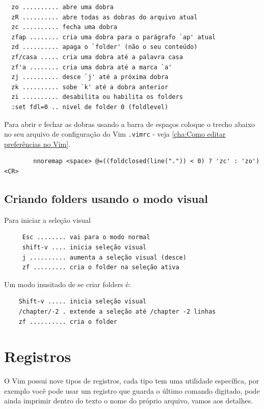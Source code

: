 \documentclass[10pt,a4paper,openany]{book}
\begin{document}
\begin{verbatim}
  zo .......... abre uma dobra
  zR .......... abre todas as dobras do arquivo atual
  zc .......... fecha uma dobra
  zfap ........ cria uma dobra para o parágrafo `ap' atual
  zd .......... apaga o `folder' (não o seu conteúdo)
  zf/casa ..... cria uma dobra até a palavra casa
  zf'a ........ cria uma dobra até a marca `a'
  zj .......... desce `j' até a próxima dobra
  zk .......... sobe `k' até a dobra anterior
  zi .......... desabilita ou habilita os folders
  :set fdl=0 .. nivel de folder 0 (foldlevel)
\end{verbatim}

Para abrir e fechar as dobras usando a barra de
espaços coloque o trecho abaixo no seu arquivo de configuração do Vim
\verb|.vimrc| - veja \ref{cha:Como editar preferências no Vim}.

\begin{verbatim}
		nnoremap <space> @=((foldclosed(line(".")) < 0) ? 'zc' : 'zo')<CR>
\end{verbatim}

\section{Criando folders usando o modo visual}
\label{Criando folders usando o modo visual}
Para iniciar a seleção visual

\begin{verbatim}
	 Esc ........ vai para o modo normal
	 shift-v .... inicia seleção visual
	 j .......... aumenta a seleção visual (desce)
	 zf ......... cria o folder na seleção ativa
\end{verbatim}

Um modo inusitado de se criar folders é:

\begin{verbatim}
	Shift-v ..... inicia seleção visual
	/chapter/-2 . extende a seleção até /chapter -2 linhas
	zf .......... cria o folder
\end{verbatim}

\chapter{Registros}
\label{Registros}

O Vim possui nove tipos de registros, cada tipo tem uma utilidade
específica, por exemplo você pode usar um registro que guarda o último
comando digitado, pode ainda imprimir dentro do texto o nome do
próprio arquivo, vamos aos detalhes.
\end{document}
